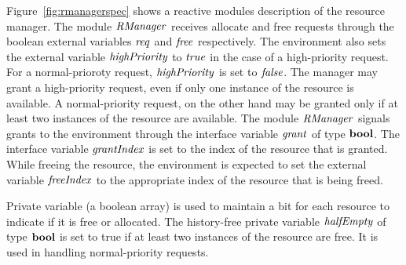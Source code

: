 \mypar Figure~\ref{fig:rmanagerspec} shows a reactive modules
description of the resource manager.  The module ${\it RManager\/}$
receives allocate and free requests through the boolean external
variables ${\it req\/}$ and ${\it free\/}$ respectively.  The environment also
sets the external variable ${\it highPriority\/}$ to ${\it true}$ in the case
of a high-priority request. For a normal-prioroty request,
${\it highPriority\/}$ is set to ${\it false}$. The manager may grant a
high-priority request, even if only one instance of the resource
is available. A normal-priority request, on the other hand may be
granted only if at least two instances of the resource are
available. The module ${\it RManager\/}$ signals grants to the
environment through the interface variable ${\it grant\/}$ of type
$\hbox{\bf bool}$. The interface variable ${\it grantIndex\/}$ is set to the index
of the resource that is granted. While freeing the resource, the
environment is expected to set the external variable ${\it freeIndex\/}$
to the appropriate index of the resource that is being freed.

\mypar
Private variable \alloc (a boolean array) is used to maintain a bit
for each resource to indicate if it is free or allocated. The
history-free private variable ${\it halfEmpty\/}$ of type $\hbox{\bf bool}$ is
set to true if at least two instances of the resource are free.
It is used in handling normal-priority requests.


